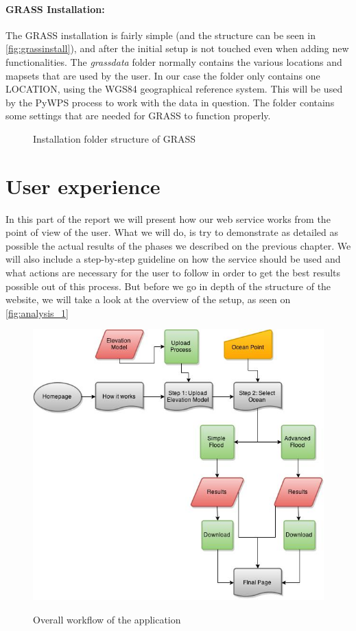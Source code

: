 \paragraph{GRASS Installation:}The GRASS installation is fairly simple (and the structure can be seen in \autoref{fig:grassinstall}), and after the initial setup is not touched even when adding new functionalities. The \textit{grassdata} folder normally contains the various locations and mapsets that are used by the user. In our case the folder only contains one LOCATION, using the WGS84 geographical reference system. This will be used by the PyWPS process to work with the data in question. 
The  folder contains some settings that are needed for GRASS to function properly.

\begin{figure}[h!]
\caption{Installation folder structure of GRASS}
\label{fig:grassinstall}
\end{figure}

\section{User experience}
In this part of the report we will present  how our web service works from the point of view of the user. What we will do, is try to demonstrate as detailed as possible the actual results of the phases we described on the previous chapter. We will also include a step-by-step guideline on how the service should be used and what actions are necessary for the user to follow in order to get the best results possible out of this process. But before we go in depth of the structure of the website, we will take a look at the overview of the setup, as seen on \autoref{fig:analysis_1}

\begin{figure}[h!]
\centering
	{\includegraphics[height=0.33\textheight]{gfx/Analysis_Website/1.jpg}}
\caption{Overall workflow of the application}
\label{fig:analysis_1}
\end{figure}

